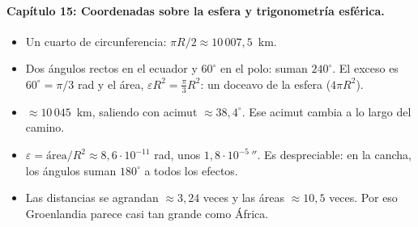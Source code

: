 \paragraph{Capítulo 15: Coordenadas sobre la esfera y trigonometría esférica.}
\begin{itemize}
  \item[\ref{pb:15-1}] Un cuarto de circunferencia: \(\pi R/2\approx10\,007{,}5\)~km.
  \item[\ref{pb:15-2}] Dos ángulos rectos en el ecuador y \(60^\circ\) en el polo: suman \(240^\circ\). El exceso es \(60^\circ=\pi/3\) rad y el área, \(\varepsilon R^2=\tfrac{\pi}{3}R^2\): un doceavo de la esfera (\(4\pi R^2\)).
  \item[\ref{pb:15-3}] \(\approx10\,045\)~km, saliendo con acimut \(\approx38{,}4^\circ\). Ese acimut cambia a lo largo del camino.
  \item[\ref{pb:15-4}] \(\varepsilon=\text{área}/R^2\approx8{,}6\cdot10^{-11}\) rad, unos \(1{,}8\cdot10^{-5}\,''\). Es despreciable: en la cancha, los ángulos suman \(180^\circ\) a todos los efectos.
  \item[\ref{pb:15-5}] Las distancias se agrandan \(\approx3{,}24\) veces y las áreas \(\approx10{,}5\) veces. Por eso Groenlandia parece casi tan grande como África.
\end{itemize}
